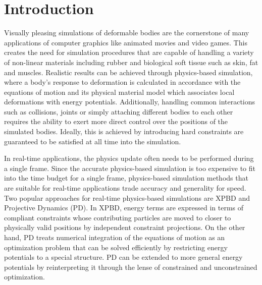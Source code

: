 \chapter{Introduction}\label{ch:introduction}
Visually pleasing simulations of deformable bodies are the cornerstone of many applications of computer graphics like animated movies and video games.
This creates the need for simulation procedures that are capable of handling a variety of non-linear materials including rubber and biological soft 
tissue such as skin, fat and muscles. Realistic results can be achieved through physics-based simulation, where a body's response to deformation is 
calculated in accordance with the equations of motion and its physical material model which associates local deformations with energy potentials. 
Additionally, handling common interactions such as collisions, joints or simply attaching different bodies to each other requires the ability to exert 
more direct control over the positions of the simulated bodies. Ideally, this is achieved by introducing hard constraints are guaranteed to be satisfied 
at all time into the simulation.

In real-time applications, the physics update often needs to be performed during a single frame. Since the accurate physics-based simulation is too 
expensive to fit into the time budget for a single frame, physics-based simulation methods that are suitable for real-time applications trade accuracy 
and generality for speed. Two popular approaches for real-time physics-based simulations are XPBD and Projective Dynamics (PD). 
In XPBD, energy terms are expressed in terms of compliant constraints whose contributing particles are moved to closer to physically valid positions 
by independent constraint projections. On the other hand, PD treats numerical integration of the equations of motion as an optimization problem that 
can be solved efficiently by restricting energy potentials to a special structure. PD can be extended to more general energy potentials by reinterpreting 
it through the lense of constrained and unconstrained optimization. 

